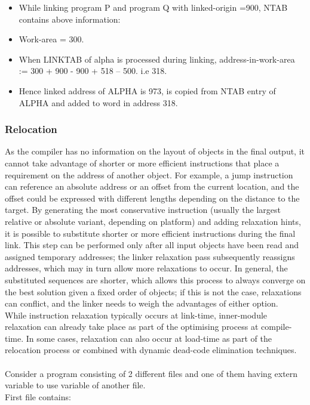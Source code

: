 \documentclass[12pt]{article}
\begin{document}
\begin{itemize}
  \item While linking program P and 
program Q with 
linked-origin
=900, NTAB 
contains above information:   
  \item Work-area
= 300. \item When LINKTAB of alpha is 
processed during linking, 
address-in-work-area
:= 300 + 
900 
-
900 + 518 
–
500. 
i.e
318. \item Hence linked address of ALPHA 
is 973, is copied from NTAB 
entry of ALPHA and added to 
word in address 318.
\end{itemize}
\subsubsection{Relocation}
As the compiler has no information on the layout of objects in the final output, it cannot take advantage of shorter or more efficient instructions that place a requirement on the address of another object. For example, a jump instruction can reference an absolute address or an offset from the current location, and the offset could be expressed with different lengths depending on the distance to the target. By generating the most conservative instruction (usually the largest relative or absolute variant, depending on platform) and adding relaxation hints, it is possible to substitute shorter or more efficient instructions during the final link. This step can be performed only after all input objects have been read and assigned temporary addresses; the linker relaxation pass subsequently reassigns addresses, which may in turn allow more relaxations to occur. In general, the substituted sequences are shorter, which allows this process to always converge on the best solution given a fixed order of objects; if this is not the case, relaxations can conflict, and the linker needs to weigh the advantages of either option.\\While instruction relaxation typically occurs at link-time, inner-module relaxation can already take place as part of the optimising process at compile-time. In some cases, relaxation can also occur at load-time as part of the relocation process or combined with dynamic dead-code elimination techniques.\\\\
Consider a program consisting of 2 different files and one of them having extern variable to use variable of another file.\\
First file contains:\\
\end{document}
